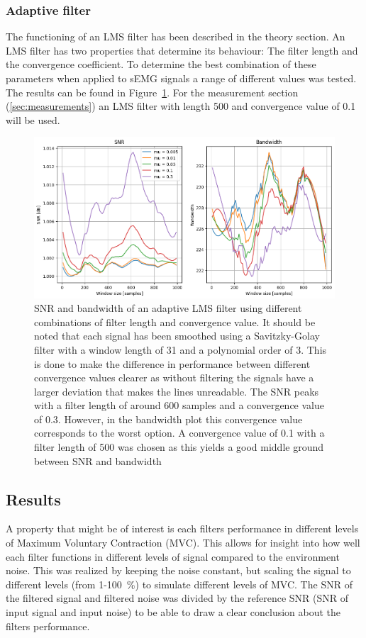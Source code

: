 \subsubsection{Adaptive filter}
The functioning of an LMS filter has been described in the theory section. An LMS filter has two properties that determine its behaviour: The filter length and the convergence coefficient. To determine the best combination of these parameters when applied to sEMG signals a range of different values was tested. The results can be found in Figure~\ref{fig:lms_filter_windowsize}. For the measurement section (\ref{sec:measurements}) an LMS filter with length 500 and convergence value of 0.1 will be used.

\begin{figure}[h!t]
	\begin{center}
		\includegraphics[width=1.0\columnwidth]{images/lms_filter_windowsize.png}
	\end{center}
	\caption{SNR and bandwidth of an adaptive LMS filter using different combinations of filter length and convergence value. It should be noted that each signal has been smoothed using a Savitzky-Golay filter with a window length of 31 and a polynomial order of 3. This is done to make the difference in performance between different convergence values clearer as without filtering the signals have a larger deviation that makes the lines unreadable. The SNR peaks with a filter length of around 600 samples and a convergence value of 0.3. However, in the bandwidth plot this convergence value corresponds to the worst option. A convergence value of 0.1 with a filter length of 500 was chosen as this yields a good middle ground between SNR and bandwidth}
	\label{fig:lms_filter_windowsize}
\end{figure}


\subsection{Results}
A property that might be of interest is each filters performance in different levels of Maximum Voluntary Contraction (MVC). This allows for insight into how well each filter functions in different levels of signal compared to the environment noise. This was realized by keeping the noise constant, but scaling the signal to different levels (from 1-\SI{100}{\percent}) to simulate different levels of MVC. The SNR of the filtered signal and filtered noise was divided by the reference SNR (SNR of input signal and input noise) to be able to draw a clear conclusion about the filters performance.

